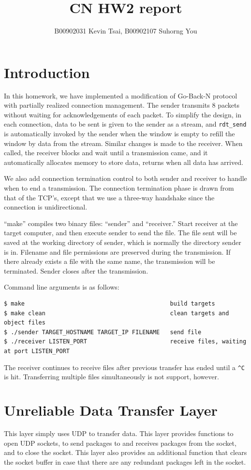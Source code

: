 \documentclass[10pt,a4paper]{article}
\author{B00902031 Kevin Tsai, B00902107 Suhorng You}
\title{CN HW2 report}
\begin{document}
\maketitle

\section{Introduction}
    In this homework, we have implemented a modification of Go-Back-N protocol with partially realized connection management. The sender transmits $8$ packets without waiting for acknowledgements of each packet. To simplify the design, in each connection, data to be sent is given to the sender as a stream, and \texttt{rdt\_send} is automatically invoked by the sender when the window is empty to refill the window by data from the stream. Similar changes is made to the receiver. When called, the receiver blocks and wait until a transmission came, and it automatically allocates memory to store data, returns when all data has arrived.

    We also add connection termination control to both sender and receiver to handle when to end a transmission. The connection termination phase is drawn from that of the TCP's, except that we use a three-way handshake since the connection is unidirectional.

    ``make'' compiles two binary files: ``sender'' and ``receiver.'' Start receiver at the target computer, and then execute sender to send the file. The file sent will be saved at the working directory of sender, which is normally the directory sender is in. Filename and file permissions are preserved during the transmission. If there already exists a file with the same name, the transmission will be terminated. Sender closes after the transmission.

    Command line arguments is as follows:
\begin{verbatim}
$ make											build targets
$ make clean									clean targets and object files
$ ./sender TARGET_HOSTNAME TARGET_IP FILENAME	send file
$ ./receiver LISTEN_PORT						receive files, waiting at port LISTEN_PORT
\end{verbatim}

    The receiver continues to receive files after previous transfer has ended until a \texttt{\^{}C} is hit. Transferring multiple files simultaneously is not support, however.
\section{Unreliable Data Transfer Layer}
    This layer simply uses UDP to transfer data. This layer provides functions to open UDP sockets, to send packages to and receives packages from the socket, and to close the socket. This layer also provides an additional function that clears the socket buffer in case that there are any redundant packages left in the socket.
\end{document}
